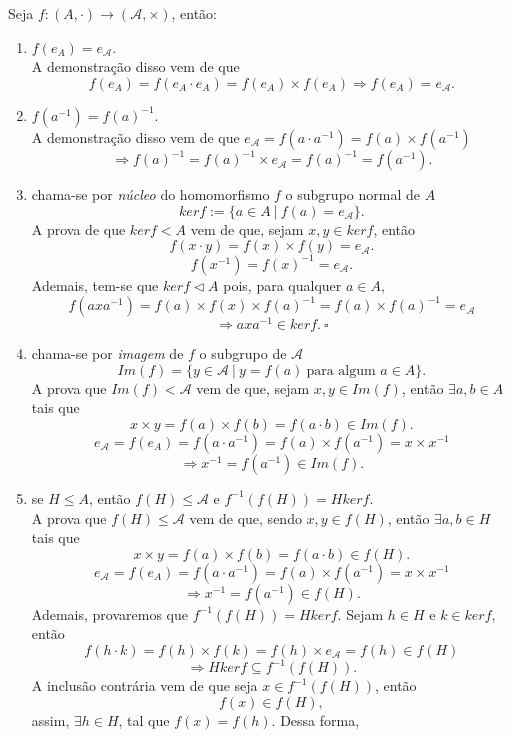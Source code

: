 \documentclass[11pt,openany]{book}
\begin{document}
Seja $f:(A,\cdot) \rightarrow (\mathcal{A}, \times)$, então:
\begin{enumerate}
    \item $f(e_A) = e_\mathcal{A}$.\\
    A demonstração disso vem de que
    \[f(e_A) = f(e_A\cdot e_A) = f(e_A) \times f(e_A) \Rightarrow f(e_A) = e_\mathcal{A}.\]
    \item $f(a^{-1}) = f(a)^{-1}$.\\
    A demonstração disso vem de que $e_\mathcal{A} = f(a\cdot a^{-1}) = f(a) \times f (a^{-1})$
    \[\Rightarrow f(a)^{-1} = f(a)^{-1}\times e_\mathcal{A} = f(a)^{-1} = f(a^{-1}).\]
    \item chama-se por \textit{núcleo} do homomorfismo $f$ o subgrupo normal de $A$
    \[ker f := \{a \in A \ | \ f(a) = e_\mathcal{A}\}.\]
    A prova de que $ker f < A$ vem de que, sejam $x,y \in ker f$, então
    \[f(x\cdot y) = f(x) \times f(y) = e_\mathcal{A}.\]
    \[f(x^{-1}) = f(x)^{-1} = e_\mathcal{A}.\]
    Ademais, tem-se que $ker f \triangleleft A$ pois, para qualquer $a \in A$,
    \[f(axa^{-1}) = f(a) \times f(x) \times f(a)^{-1} = f(a) \times f(a)^{-1} = e_\mathcal{A}\]
    \[\Rightarrow axa^{-1} \in ker f. \ \square\]
    \item chama-se por \textit{imagem} de $f$ o subgrupo de $\mathcal{A}$
    \[Im(f) = \{y \in \mathcal{A} \ | \ y = f(a) \ \text{para algum $a \in A$}\}.\]
    A prova que $Im(f) < \mathcal{A}$ vem de que, sejam $x,y \in Im(f)$, então $\exists a,b \in A$ tais que
    \[x\times y = f(a) \times f(b) = f(a\cdot b) \in Im(f).\]
    \[e_\mathcal{A} = f(e_A) = f(a\cdot a^{-1}) = f(a)\times f(a^{-1}) = x \times x^{-1}\]
    \[\Rightarrow x^{-1} = f(a^{-1}) \in Im(f).\]
    \item se $H \leq A$, então $f(H) \leq \mathcal{A}$ e $f^{-1}(f(H)) = Hker f.$ \label{item:pre_imagem_H_ker_f}\\
    A prova que $f(H) \leq \mathcal{A}$ vem de que, sendo $x,y \in f(H)$, então $\exists a,b \in H$ tais que
    \[x \times y = f(a) \times f(b) = f(a\cdot b) \in f(H).\]
    \[e_\mathcal{A} = f(e_A) = f(a\cdot a^{-1}) = f(a)\times f(a^{-1}) = x \times x^{-1}\]
    \[\Rightarrow x^{-1} = f(a^{-1}) \in f(H).\]
    Ademais, provaremos que $f^{-1}(f(H)) = Hker f$.
    Sejam $h \in H$ e $k \in ker f$, então
    \[f(h\cdot k) = f(h) \times f(k) = f(h) \times e_\mathcal{A} = f(h) \in f(H)\]
    \[\Rightarrow Hker f \subseteq f^{-1}(f(H)).\]
    A inclusão contrária vem de que seja $x \in f^{-1}(f(H))$, então
    \[f(x) \in f(H),\]
    assim, $\exists h \in H$, tal que $f(x) = f(h)$. Dessa forma,

\end{enumerate}
\end{document}
